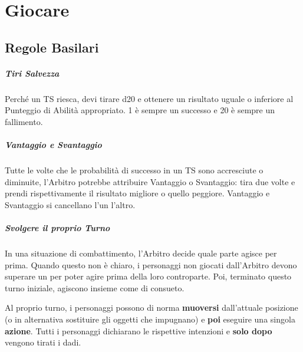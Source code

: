 \documentclass[itdr]{subfiles}
\begin{document}
\cleartoleftpage

\chapter{Giocare}
\label{ch:giocare}

\section{Regole Basilari}

\paragraph{Tiri Salvezza}
Perché un TS riesca, devi tirare d20 e ottenere un risultato uguale o inferiore al Punteggio di Abilità appropriato. 1 è sempre un successo e 20 è \mbox{sempre} un fallimento.

\vfill

\paragraph{Vantaggio e Svantaggio}
Tutte le volte che le probabilità di successo in un TS sono accresciute o diminuite, l’Arbitro potrebbe attribuire Vantaggio o Svantaggio: tira due volte e prendi rispettivamente il risultato migliore o quello peggiore. Vantaggio e Svantaggio si cancellano l’un l’altro. 

\vfill

\paragraph{Svolgere il proprio Turno}
In una situazione di combattimento, l’Arbitro decide quale parte agisce per prima. Quando questo non è chiaro, i personaggi non giocati dall'Arbitro devono superare un  per poter agire prima della loro controparte. Poi, terminato questo turno iniziale, agiscono insieme come di consueto.

Al proprio turno, i personaggi possono di norma \textbf{muoversi} dall’attuale posizione (o in alternativa sostituire gli oggetti che impugnano) e \textbf{poi} eseguire una singola \textbf{azione}. Tutti i personaggi dichiarano le rispettive \mbox{intenzioni} e \textbf{solo dopo} vengono tirati i dadi. 

\vfill
\end{document}
